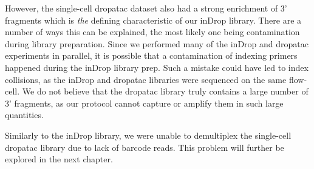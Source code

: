 However, the single-cell \acrshort{dropatac} dataset also had a strong enrichment of 3' fragments which is \textit{the} defining characteristic of our inDrop library. There are a number of ways this can be explained, the most likely one being contamination during library preparation. Since we performed many of the inDrop and \acrshort{dropatac} experiments in parallel, it is possible that a contamination of indexing primers happened during the inDrop library prep. Such a mistake could have led to index collisions, as the inDrop and \acrshort{dropatac} libraries were sequenced on the same flow-cell. We do not believe that the \acrshort{dropatac} library truly contains a large number of 3' fragments, as our protocol cannot capture or amplify them in such large quantities.\pms

Similarly to the inDrop library, we were unable to demultiplex the single-cell \acrshort{dropatac} library due to lack of barcode reads. This problem will further be explored in the next chapter.\pms


